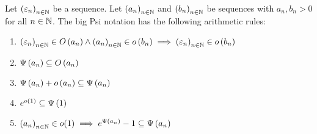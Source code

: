 \begin{theorem} \label{thm:bigpsi:rules}
  Let $\seq{\epsilon_n}$ be a sequence. Let $\seq{a_n}$ and $\seq{b_n}$ be sequences with $a_n,b_n > 0$ for all $n\in\N$. The big Psi notation has the following arithmetic rules:

  \begin{enumerate}
    \item $\seq{\epsilon_n} \in \bigo{a_n} \land \seq{a_n} \in \littleo{b_n} \implies \seq{\epsilon_n} \in \littleo{b_n}$
    \item $\bigpsi{a_n} \subseteq \bigo{a_n}$
    \item $\bigpsi{a_n} + \littleo{a_n} \subseteq \bigpsi{a_n}$
    \item $e^{\littleo{1}} \subseteq \bigpsi{1}$
    \item $\seq{a_n} \in o(1) \implies e^{\bigpsi{a_n}}-1 \subseteq \bigpsi{a_n}$
  \end{enumerate}
\end{theorem}
